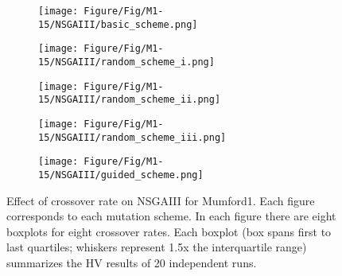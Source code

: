 \begin{figure}[!htbp]
	\centering
	\begin{subfigure}[b]{0.52\textwidth}
		\texttt{[image: Figure/Fig/M1-15/NSGAIII/basic\_scheme.png]}
	\end{subfigure}%
	\begin{subfigure}[b]{0.52\textwidth}
		\texttt{[image: Figure/Fig/M1-15/NSGAIII/random\_scheme\_i.png]}
	\end{subfigure}%
	\newline
	\begin{subfigure}[b]{0.52\textwidth}
		\texttt{[image: Figure/Fig/M1-15/NSGAIII/random\_scheme\_ii.png]}
	\end{subfigure}%
	\begin{subfigure}[b]{0.52\textwidth}
		\texttt{[image: Figure/Fig/M1-15/NSGAIII/random\_scheme\_iii.png]}
	\end{subfigure}%
	\newline
	\begin{subfigure}[b]{0.52\textwidth}
		\texttt{[image: Figure/Fig/M1-15/NSGAIII/guided\_scheme.png]}
	\end{subfigure}%
	\caption{Effect of crossover rate on NSGAIII for Mumford1. Each figure corresponds to each mutation scheme. In each figure there are eight boxplots for eight crossover rates.  Each boxplot (box spans first to last quartiles; whiskers represent 1.5x the interquartile range) summarizes the HV results of 20 independent runs.}
	\label{fig:cr_m1_nsgaiii}
\end{figure}
